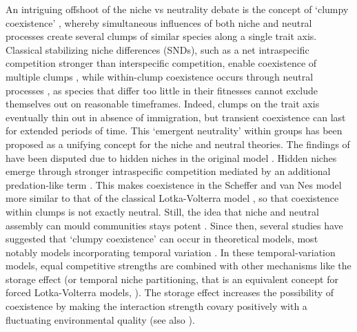 \documentclass[a4paper,12pt]{article}
\begin{document}
An intriguing offshoot of the niche vs neutrality debate is the concept
of `clumpy coexistence' \citep{scheffer_self-organized_2006}, whereby
simultaneous influences of both niche and neutral processes create
several clumps of similar species along a single trait axis. Classical
stabilizing niche differences (SNDs), such as a net intraspecific
competition stronger than interspecific competition, enable coexistence
of multiple clumps \citep{chesson_mechanisms_2000}, while within-clump
coexistence occurs through neutral processes \citep{hubbell_unified_2001,munoz_neutral_2016},
as species that differ too little in their fitnesses cannot exclude
themselves out on reasonable timeframes. Indeed, clumps on the trait
axis eventually thin out in absence of immigration, but transient
coexistence can last for extended periods of time. This `emergent
neutrality' within groups \citep{holt_emergent_2006} has been proposed
as a unifying concept for the niche and neutral theories. The findings
of \citet{scheffer_self-organized_2006} have been disputed due to
hidden niches in the original model \citep{barabas_emergent_2013}.
Hidden niches emerge through stronger intraspecific competition mediated
by an additional predation-like term \citep{barabas_emergent_2013}.
This makes coexistence in the Scheffer and van Nes model more similar
to that of the classical Lotka-Volterra model \citep{barabas_effect_2016},
so that coexistence within clumps is not exactly neutral. Still, the
idea that niche and neutral assembly can mould communities stays potent
\citep{haegeman_mathematical_2011,vergnon_interpretation_2013}. Since
then, several studies have suggested that `clumpy coexistence' can
occur in theoretical models, most notably models incorporating temporal
variation \citep{scranton_coexistence_2016,sakavara_lumpy_2018}.
In these temporal-variation models, equal competitive strengths are
combined with other mechanisms like the storage effect (or temporal
niche partitioning, that is an equivalent concept for forced Lotka-Volterra
models, \citealp{barabas_community_2012,scranton_coexistence_2016}).
The storage effect increases the possibility of coexistence by making
the interaction strength covary positively with a fluctuating environmental
quality (see also \citealp{barabas_community_2012}). 
\end{document}
